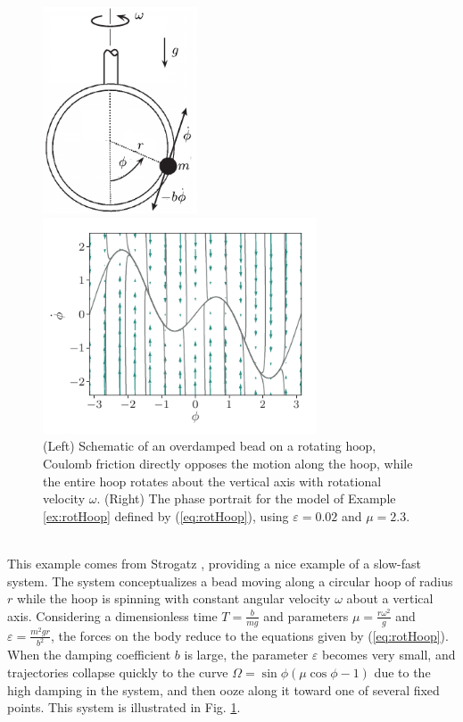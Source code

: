 \documentclass[twocolumn]{svjour3}
\begin{document}
\begin{figure}
\begin{minipage}{3.2in}
\centering
\includegraphics[width=1.8in]{Fig6}
\end{minipage}
\begin{minipage}{3.2in}
\centering
\includegraphics[width=3.2in]{Fig7}
\end{minipage}
\caption{\label{fig:rotHoopA} (Left) Schematic of an overdamped bead on a rotating hoop, Coulomb friction directly opposes the motion along the hoop, while the entire hoop rotates about the vertical axis with rotational velocity $\omega$. (Right) The phase portrait for the model of Example \ref{ex:rotHoop} defined by (\ref{eq:rotHoop}), using $\varepsilon = 0.02$ and $\mu = 2.3$.}
\end{figure}

 \\
This example comes from Strogatz \cite[Section 3.5]{strogatz_nonlinear_2014}, providing a nice example of a slow-fast system. The system conceptualizes a bead moving along a circular hoop of radius $r$ while the hoop is spinning with constant angular velocity $\omega$ about a vertical axis. Considering a dimensionless time $T=\tfrac{b}{mg}$ and parameters $\mu=\tfrac{r\omega^2}{g}$ and $\varepsilon=\tfrac{m^2gr}{b^2}$, the forces on the body reduce to the equations given by (\ref{eq:rotHoop}). When the damping coefficient $b$ is large, the parameter $\varepsilon$ becomes very small, and trajectories collapse quickly to the curve $\Omega = \sin\phi (\mu \cos\phi - 1)$ due to the high damping in the system, and then ooze along it toward one of several fixed points. This system is illustrated in Fig. \ref{fig:rotHoopA}.
\end{document}
